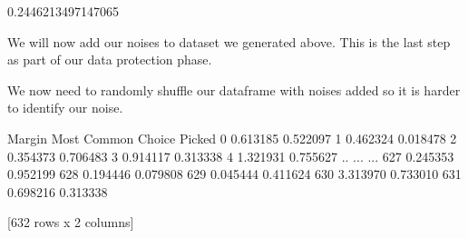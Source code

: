 \documentclass[letterpaper,10pt,english]{jupyterBook}
\begin{document}
\begin{sphinxVerbatim}[commandchars=\\\{\}]
  
\end{sphinxVerbatim}

\begin{sphinxVerbatim}[commandchars=\\\{\}]
0.2446213497147065
\end{sphinxVerbatim}

\sphinxAtStartPar
We will now add our noises to dataset we generated above. This is the last step as part of our data protection phase.

\begin{sphinxVerbatim}[commandchars=\\\{\}]
  \PYG{p}{[}\PYG{p}{[} \PYG{p}{]}\PYG{p}{]}
\end{sphinxVerbatim}

\begin{sphinxVerbatim}[commandchars=\\\{\}]
  
\end{sphinxVerbatim}

\sphinxAtStartPar
We now need to randomly shuffle our dataframe with noises added so it is harder to identify our noise.

\begin{sphinxVerbatim}[commandchars=\\\{\}]
  
\end{sphinxVerbatim}

\begin{sphinxVerbatim}[commandchars=\\\{\}]
       Margin  Most Common Choice Picked
0    0.613185                   0.522097
1   \PYGZhy{}0.462324                  \PYGZhy{}0.018478
2   \PYGZhy{}0.354373                  \PYGZhy{}0.706483
3   \PYGZhy{}0.914117                  \PYGZhy{}0.313338
4   \PYGZhy{}1.321931                  \PYGZhy{}0.755627
..        ...                        ...
627  0.245353                  \PYGZhy{}0.952199
628 \PYGZhy{}0.194446                   0.079808
629  0.045444                  \PYGZhy{}0.411624
630 \PYGZhy{}3.313970                   0.733010
631 \PYGZhy{}0.698216                  \PYGZhy{}0.313338

[632 rows x 2 columns]
\end{sphinxVerbatim}
\end{document}
